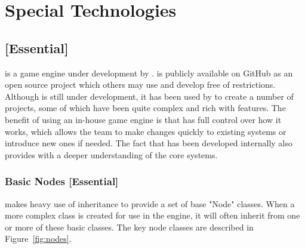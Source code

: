 \documentclass{GlobalDocument}
\begin{document}
\section{Special Technologies}

\subsection{\ourengine{} [Essential]}
\ourengine{} is a game engine under development by \ourteam{}. \ourengine{} is publicly available on GitHub as an open source project which others may use and develop free of restrictions. Although \ourengine{} is still under development, it has been used by \ourteam{} to create a number of projects, some of which have been quite complex and rich with features. The benefit of using an in-house game engine is that \ourteam{} has full control over how it works, which allows the team to make changes quickly to existing systems or introduce new ones if needed. The fact that \ourengine{} has been developed internally also provides \ourteam{} with a deeper understanding of the core systems.

\subsubsection{Basic Nodes [Essential]}
\ourengine{} makes heavy use of inheritance to provide a set of base "Node" classes. When a more complex class is created for use in the engine, it will often inherit from one or more of these basic classes. The key node classes are described in Figure~\ref{fig:nodes}.
\end{document}
